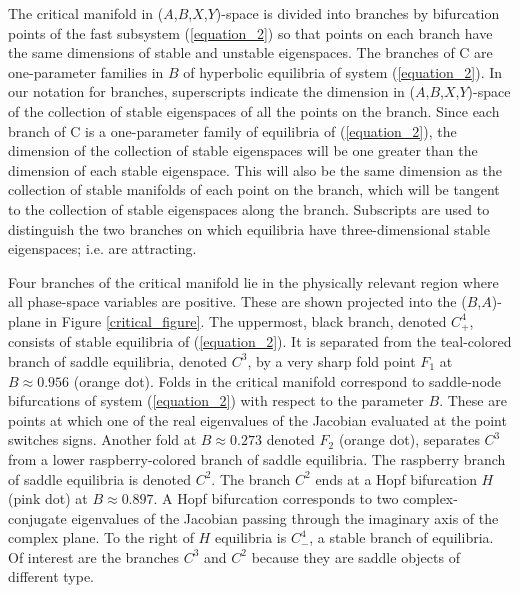 \documentclass{ws-ijbc}
\begin{document}
The critical manifold in ($A$,$B$,$X$,$Y$)-space is divided into branches by bifurcation points of the fast subsystem (\ref{equation_2}) so that points on each branch have the same dimensions of stable and unstable eigenspaces.  The branches of C are one-parameter families in $B$ of hyperbolic equilibria of system (\ref{equation_2}).  In our notation for branches, superscripts indicate the dimension in ($A$,$B$,$X$,$Y$)-space of the collection of stable eigenspaces of all the points on the branch.  Since each branch of C is a one-parameter family of equilibria of (\ref{equation_2}), the dimension of the collection of stable eigenspaces will be one greater than the dimension of each stable eigenspace.  This will also be the same dimension as the collection of stable manifolds of each point on the branch, which will be tangent to the collection of stable eigenspaces along the branch.  Subscripts are used to distinguish the two branches on which equilibria have three-dimensional stable eigenspaces; i.e. are attracting.  

Four branches of the critical manifold lie in the physically relevant region where all phase-space variables are positive.  These are shown projected into the ($B$,$A$)-plane in Figure \ref{critical_figure}.  The uppermost, black branch, denoted $C^4_+$, consists of stable equilibria of (\ref{equation_2}).  It is separated from the teal-colored branch of saddle equilibria, denoted $C^3$, by a very sharp fold point $F_1$ at $B \approx 0.956$ (orange dot).  Folds in the critical manifold correspond to saddle-node bifurcations of system (\ref{equation_2}) with respect to the parameter $B$.  These are points at which one of the real eigenvalues of the Jacobian evaluated at the point switches signs.  Another fold at $B \approx 0.273$ denoted $F_2$ (orange dot), separates $C^3$ from a lower raspberry-colored branch of saddle equilibria.  The raspberry branch of saddle equilibria is denoted $C^2$.   The branch $C^2$ ends at a Hopf bifurcation $H$ (pink dot) at $B \approx 0.897$.  A Hopf bifurcation corresponds to two complex-conjugate eigenvalues of the Jacobian passing through the imaginary axis of the complex plane.  To the right of $H$ equilibria is $C^4_-$, a stable branch of equilibria.  Of interest are the branches $C^3$ and $C^2$ because they are saddle objects of different type.
\end{document}
